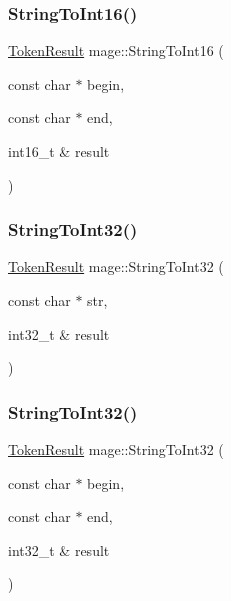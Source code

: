 \hypertarget{namespacemage_aa993ba23b5023902c29ecbe9b0d7a954}{}\label{namespacemage_aa993ba23b5023902c29ecbe9b0d7a954} 
\subsubsection{\texorpdfstring{String\+To\+Int16()}{StringToInt16()}\hspace{0.1cm}{\footnotesize\ttfamily [2/2]}}
{\footnotesize\ttfamily \hyperlink{namespacemage_a2178ba2411db5912f41b2e7698c2037d}{Token\+Result} mage\+::\+String\+To\+Int16 (\begin{DoxyParamCaption}\item[{const char $\ast$}]{begin,  }\item[{const char $\ast$}]{end,  }\item[{int16\+\_\+t \&}]{result }\end{DoxyParamCaption})}

\hypertarget{namespacemage_a805f1cf7436782f77b49085194451d07}{}\label{namespacemage_a805f1cf7436782f77b49085194451d07} 
\subsubsection{\texorpdfstring{String\+To\+Int32()}{StringToInt32()}\hspace{0.1cm}{\footnotesize\ttfamily [1/2]}}
{\footnotesize\ttfamily \hyperlink{namespacemage_a2178ba2411db5912f41b2e7698c2037d}{Token\+Result} mage\+::\+String\+To\+Int32 (\begin{DoxyParamCaption}\item[{const char $\ast$}]{str,  }\item[{int32\+\_\+t \&}]{result }\end{DoxyParamCaption})}

\hypertarget{namespacemage_a011b7977a7ae88795aac61e0e921bffe}{}\label{namespacemage_a011b7977a7ae88795aac61e0e921bffe} 
\subsubsection{\texorpdfstring{String\+To\+Int32()}{StringToInt32()}\hspace{0.1cm}{\footnotesize\ttfamily [2/2]}}
{\footnotesize\ttfamily \hyperlink{namespacemage_a2178ba2411db5912f41b2e7698c2037d}{Token\+Result} mage\+::\+String\+To\+Int32 (\begin{DoxyParamCaption}\item[{const char $\ast$}]{begin,  }\item[{const char $\ast$}]{end,  }\item[{int32\+\_\+t \&}]{result }\end{DoxyParamCaption})}

